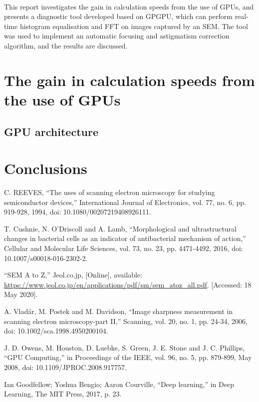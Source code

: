 \documentclass[12pt, twocolumn]{report}
\begin{document}
\paragraph{}
This report investigates the gain in calculation speeds from the use of GPUs, and presents a diagnostic tool developed based on GPGPU, which can perform real-time histogram equalisation and FFT on images captured by an SEM. The tool was used to implement an automatic focusing and astigmatism correction algorithm, and the results are discussed.

\section{The gain in calculation speeds from the use of GPUs}
\subsection{GPU architecture}


\section{Conclusions}

\begin{thebibliography}{00}
    C. REEVES, ``The uses of scanning electron microscopy for studying semiconductor devices,'' International Journal of Electronics, vol. 77, no. 6, pp. 919-928, 1994, doi: 10.1080/00207219408926111.

    T. Cushnie, N. O’Driscoll and A. Lamb, ``Morphological and ultrastructural changes in bacterial cells as an indicator of antibacterial mechanism of action,'' Cellular and Molecular Life Sciences, vol. 73, no. 23, pp. 4471-4492, 2016, doi: 10.1007/s00018-016-2302-2.

    ``SEM A to Z,'' Jeol.co.jp, [Online], available: \url{https://www.jeol.co.jp/en/applications/pdf/sm/sem_atoz_all.pdf}. [Accessed: 18 May 2020].

    A. Vladár, M. Postek and M. Davidson, ``Image sharpness measurement in scanning electron microscopy-part II,'' Scanning, vol. 20, no. 1, pp. 24-34, 2006, doi: 10.1002/sca.1998.4950200104.

    J. D. Owens, M. Houston, D. Luebke, S. Green, J. E. Stone and J. C. Phillips, ``GPU Computing,'' in Proceedings of the IEEE, vol. 96, no. 5, pp. 879-899, May 2008, doi: 10.1109/JPROC.2008.917757.

    Ian Goodfellow; Yoshua Bengio; Aaron Courville, ``Deep learning,'' in Deep Learning, The MIT Press, 2017, p. 23.
\end{thebibliography}
\end{document}
